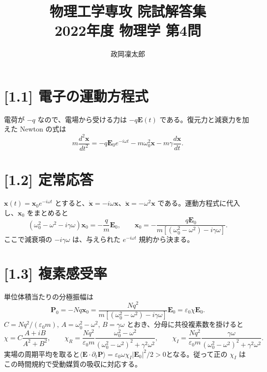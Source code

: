 \documentclass[11pt,a4paper]{article}
\title{物理工学専攻 院試解答集\\2022年度 物理学 第4問}
\author{政岡凜太郎}
\date{}
\begin{document}
\maketitle

\section*{[1.1] 電子の運動方程式}
電荷が $-q$ なので、電場から受ける力は $-q\boldsymbol E(t)$ である。復元力と減衰力を加えた Newton の式は
\[
\boxed{m\frac{d^2\boldsymbol x}{dt^2}=-q\boldsymbol E_0e^{-i\omega t}-m\omega_0^2\boldsymbol x-m\gamma\frac{d\boldsymbol x}{dt}}.
\]

\section*{[1.2] 定常応答}
$\boldsymbol x(t)=\boldsymbol x_0e^{-i\omega t}$ とすると、$\dot{\boldsymbol x}=-i\omega\boldsymbol x$、$\ddot{\boldsymbol x}=-\omega^2\boldsymbol x$ である。運動方程式に代入し、$\boldsymbol x_0$ をまとめると
\[
\left(\omega_0^2-\omega^2-i\gamma\omega\right)\boldsymbol x_0=-\frac{q}{m}\boldsymbol E_0,
\qquad
\boxed{\boldsymbol x_0=-\frac{q\boldsymbol E_0}{m\left[(\omega_0^2-\omega^2)-i\gamma\omega\right]}}.
\]
ここで減衰項の $-i\gamma\omega$ は、与えられた $e^{-i\omega t}$ 規約から決まる。

\section*{[1.3] 複素感受率}
単位体積当たりの分極振幅は
\[
\boldsymbol P_0=-Nq\boldsymbol x_0
=\frac{Nq^2}{m[(\omega_0^2-\omega^2)-i\gamma\omega]}\boldsymbol E_0
=\varepsilon_0\chi\boldsymbol E_0.
\]
$C=Nq^2/(\varepsilon_0m)$, $A=\omega_0^2-\omega^2$, $B=\gamma\omega$ とおき、分母に共役複素数を掛けると
\[
\chi=C\frac{A+iB}{A^2+B^2},\qquad
\boxed{\chi_R=\frac{Nq^2}{\varepsilon_0m}\frac{\omega_0^2-\omega^2}{(\omega_0^2-\omega^2)^2+\gamma^2\omega^2}},
\qquad
\boxed{\chi_I=\frac{Nq^2}{\varepsilon_0m}\frac{\gamma\omega}{(\omega_0^2-\omega^2)^2+\gamma^2\omega^2}}.
\]
実場の周期平均を取ると$\langle\boldsymbol E\cdot\partial_t\boldsymbol P\rangle=\varepsilon_0\omega\chi_I|\boldsymbol E_0|^2/2>0$となる。従って正の $\chi_I$ はこの時間規約で受動媒質の吸収に対応する。
\end{document}
